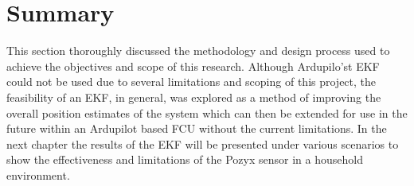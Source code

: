 \section{Summary}
This section thoroughly discussed the methodology and design process used to achieve the objectives and scope of this research.
Although Ardupilo'st EKF could not be used due to several limitations and scoping of this project, the feasibility of an EKF, in general, was explored as a method of improving the
overall position estimates of the system which can then be extended for use in the future within an Ardupilot based FCU without the current limitations.
In the next chapter the results of the EKF will be presented under various scenarios to show the effectiveness and limitations of the Pozyx sensor in a household environment.
